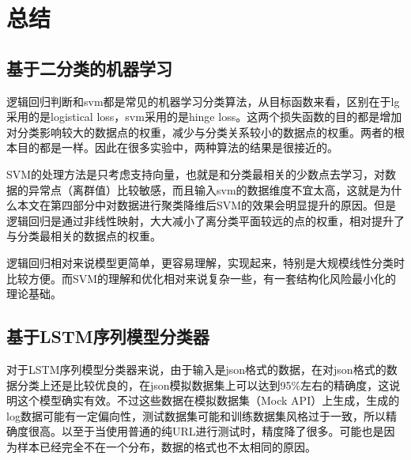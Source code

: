 \section{总结}
\subsection{基于二分类的机器学习}
逻辑回归判断和svm都是常见的机器学习分类算法，从目标函数来看，区别在于lg采用的是logistical loss，svm采用的是hinge loss。这两个损失函数的目的都是增加对分类影响较大的数据点的权重，减少与分类关系较小的数据点的权重。两者的根本目的都是一样。因此在很多实验中，两种算法的结果是很接近的。

SVM的处理方法是只考虑支持向量，也就是和分类最相关的少数点去学习，对数据的异常点（离群值）比较敏感，而且输入svm的数据维度不宜太高，这就是为什么本文在第四部分中对数据进行聚类降维后SVM的效果会明显提升的原因。但是逻辑回归是通过非线性映射，大大减小了离分类平面较远的点的权重，相对提升了与分类最相关的数据点的权重。


逻辑回归相对来说模型更简单，更容易理解，实现起来，特别是大规模线性分类时比较方便。而SVM的理解和优化相对来说复杂一些，有一套结构化风险最小化的理论基础。
\subsection{基于LSTM序列模型分类器}
对于LSTM序列模型分类器来说，由于输入是json格式的数据，在对json格式的数据分类上还是比较优良的，在json模拟数据集上可以达到95\%左右的精确度，这说明这个模型确实有效。不过这些数据在模拟数据集（Mock API）上生成，生成的log数据可能有一定偏向性，测试数据集可能和训练数据集风格过于一致，所以精确度很高。以至于当使用普通的纯URL进行测试时，精度降了很多。可能也是因为样本已经完全不在一个分布，数据的格式也不太相同的原因。